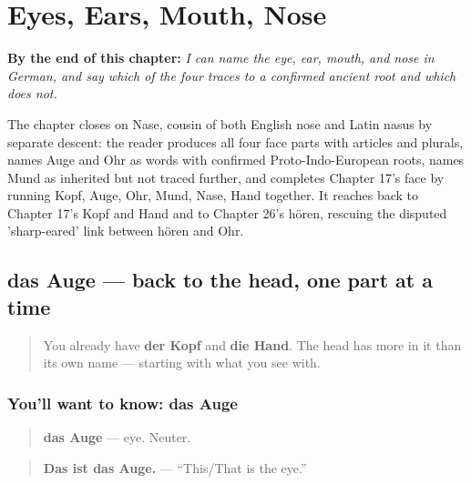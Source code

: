 
\chapter{Eyes, Ears, Mouth, Nose}
\label{ch:ge-face-parts}

\begin{chapteropening}
\textbf{By the end of this chapter:} \emph{I can name the eye, ear, mouth, and nose in German, and say which of the four traces to a confirmed ancient root and which does not.}

The chapter closes on Nase, cousin of both English nose and Latin nasus by separate descent: the reader produces all four face parts with articles and plurals, names Auge and Ohr as words with confirmed Proto-Indo-European roots, names Mund as inherited but not traced further, and completes Chapter 17's face by running Kopf, Auge, Ohr, Mund, Nase, Hand together. It reaches back to Chapter 17's Kopf and Hand and to Chapter 26's hören, rescuing the disputed 'sharp-eared' link between hören and Ohr.
\end{chapteropening}

\section[das Auge]{das Auge — back to the head, one part at a time}

\label{lesson:GE-C30-auge}



\begin{quote}
You already have \textbf{der Kopf} and \textbf{die Hand}. The head has more in it than its own name — starting with what you see with.
\end{quote}

\subsection*{You'll want to know: das Auge}
\begin{quote}
\textbf{das Auge} — eye. Neuter.
\end{quote}

\begin{quote}
\textbf{Das ist das Auge.} — \textquotedblleft{}This/That is the eye.\textquotedblright{}
\end{quote}

